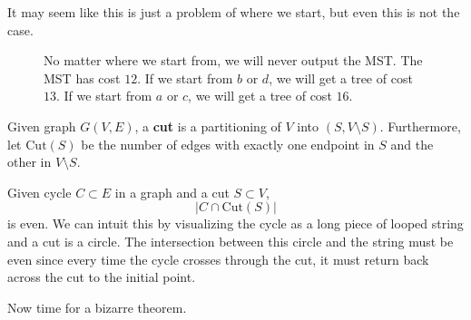   It may seem like this is just a problem of where we start, but even this is not the case. 

  \begin{figure}[H]
    \centering 
    \caption{No matter where we start from, we will never output the MST. The MST has cost $12$. If  we start from $b$ or $d$, we will get a tree of cost $13$. If we start from $a$ or $c$, we will get a tree of cost $16$.}
    \label{fig:dik_mst_prob2}
  \end{figure}

  \begin{definition}[Cuts]
    \label{def:cuts}
      
    Given graph $G(V, E)$, a \textbf{cut} is a partitioning of $V$ into $(S, V \setminus S)$. Furthermore, let $\mathrm{Cut}(S)$ be the number of edges with exactly one endpoint in $S$ and the other in $V \setminus S$. 
  \end{definition}

  \begin{theorem}
    \label{thm:cycles-and-cuts}
    Given cycle $C \subset E$ in a graph and a cut $S \subset V$, 
    \begin{equation}
      | C \cap \mathrm{Cut}(S) | 
    \end{equation}
    is even. We can intuit this by visualizing the cycle as a long piece of looped string and a cut is a circle. The intersection between this circle and the string must be even since every time the cycle crosses through the cut, it must return back across the cut to the initial point.  
  \end{theorem}

  Now time for a bizarre theorem. 

